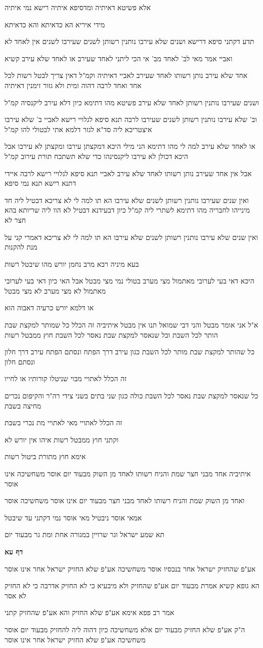 \documentclass[12pt, openany]{book}
\newcommand{\sethebfont}{
\fontsize{10.5pt}{21.0pt} \selectfont
}
\newcommand{\textblock}[1]{
{\sethebfont #1\\}	
}
\newcommand{\sectname}{}
\newcommand{\newsection}[1]{
	\addcontentsline{toc}{section}{#1}
	\renewcommand{\sectname}{#1}	
	\vspace{-\baselineskip}
	\begin{center}
		\textbf{%
\fontsize{16pt}{16pt}\selectfont
			#1}
	\end{center}
	\vspace{-\baselineskip}
	\nopagebreak
}
\begin{document}
\textblock{אלא פשיטא דאיתיה ומדסיפא איתיה רישא נמי איתיה}
\textblock{מידי איריא הא כדאיתא והא כדאיתא}
\textblock{תדע דקתני סיפא דרישא ושנים שלא עירבו נותנין רשותן לשנים שעירבו לשנים אין לאחד לא}
\textblock{ואביי אמר מאי לב' לאחד מב' אי הכי ליתני לאחד שעירב או לאחד שלא עירב קשיא}
\textblock{אחד שלא עירב נותן רשותו לאחד שעירב לאביי דאיתיה וקמ"ל דאין צריך לבטל רשות לכל אחד ואחד לרבה דהוה ומית ולא גזור זימנין דאיתיה}
\textblock{ושנים שעירבו נותנין רשותן לאחד שלא עירב פשיטא מהו דתימא כיון דלא עירב ליקנסיה קמ"ל}
\textblock{וב' שלא עירבו נותנין רשותן לשנים שעירבו לרבה תנא סיפא לגלויי רישא לאביי ב' שלא עירבו איצטריכא ליה סד"א לגזר דלמא אתי לבטולי להו קמ"ל}
\textblock{או לאחד שלא עירב למה לי מהו דתימא הני מילי היכא דמקצתן עירבו ומקצתן לא עירבו אבל היכא דכולן לא עירבו ליקנסינהו כדי שלא תשתכח תורת עירוב קמ"ל}
\textblock{אבל אין אחד שעירב נותן רשותו לאחד שלא עירב לאביי תנא סיפא לגלויי רישא לרבה איידי דתנא רישא תנא נמי סיפא}
\textblock{ואין שנים שעירבו נותנין רשותן לשנים שלא עירבו הא תו למה לי לא צריכא דבטיל ליה חד מינייהו לחבריה מהו דתימא לשתרי ליה קמ"ל כיון דבעידנא דבטיל לא הוו ליה שריותא בהא חצר לא}
\textblock{ואין שנים שלא עירבו נותנין רשותן לשנים שלא עירבו הא תו למה לי לא צריכא דאמרי קני על מנת להקנות}
\textblock{בעא מיניה רבא מרב נחמן יורש מהו שיבטל רשות}
\textblock{היכא דאי בעי לערובי מאתמול מצי מערב בטולי נמי מצי מבטל אבל האי כיון דאי בעי לערובי מאתמול לא מצי מערב לא מצי מבטל}
\textblock{או דלמא יורש כרעיה דאבוה הוא}
\textblock{א"ל אני אומר מבטל והני דבי שמואל תנו אין מבטל איתיביה זה הכלל כל שמותר למקצת שבת הותר לכל השבת וכל שנאסר למקצת שבת נאסר לכל השבת חוץ ממבטל רשות}
\textblock{כל שהותר למקצת שבת מותר לכל השבת כגון עירב דרך הפתח ונסתם הפתח עירב דרך חלון ונסתם חלון}
\textblock{זה הכלל לאתויי מבוי שניטלו קורותיו או לחייו}
\textblock{כל שנאסר למקצת שבת נאסר לכל השבת כולה כגון שני בתים בשני צידי רה"ר והקיפום נכרים מחיצה בשבת}
\textblock{זה הכלל לאתויי מאי לאתויי מת נכרי בשבת}
\textblock{וקתני חוץ ממבטל רשות איהו אין יורש לא}
\textblock{אימא חוץ מתורת ביטול רשות}
\textblock{איתיביה אחד מבני חצר שמת והניח רשותו לאחד מן השוק מבעוד יום אוסר משחשיכה אינו אוסר}
\textblock{ואחד מן השוק שמת והניח רשותו לאחד מבני חצר מבעוד יום אינו אוסר משחשיכה אוסר}
\textblock{אמאי אוסר ניבטיל מאי אוסר נמי דקתני עד שיבטל}
\textblock{תא שמע ישראל וגר שרויין במגורה אחת ומת גר מבעוד יום}
\newsection{דף עא}
\textblock{אע"פ שהחזיק ישראל אחר בנכסיו אוסר משחשיכה אע"פ שלא החזיק ישראל אחר אינו אוסר}
\textblock{הא גופא קשיא אמרת מבעוד יום אע"פ שהחזיק ולא מיבעיא כי לא החזיק אדרבה כי לא החזיק לא אסר}
\textblock{אמר רב פפא אימא אע"פ שלא החזיק והא אע"פ שהחזיק קתני}
\textblock{ה"ק אע"פ שלא החזיק מבעוד יום אלא משחשיכה כיון דהוה ליה להחזיק מבעוד יום אוסר משחשיכה אע"פ שלא החזיק ישראל אחר אינו אוסר}
\end{document}
